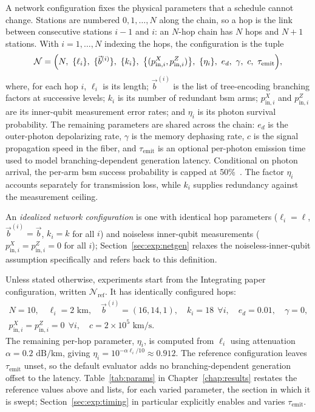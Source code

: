 A network configuration fixes the physical parameters that a schedule cannot change. Stations are numbered $0,1,\dots,N$ along the chain, so a hop is the link between consecutive stations $i-1$ and $i$: an $N$-hop chain has $N$ hops and $N+1$ stations. With $i=1,\dots,N$ indexing the hops, the configuration is the tuple
\[
    \mathcal{N} = \Bigl(N,\ \{\ell_i\},\ \{\vec{b}^{(i)}\},\ \{k_i\},\ \bigl\{(p_{\mathrm{in},i}^{X}, p_{\mathrm{in},i}^{Z})\bigr\},\ \{\eta_i\},\ e_d,\ \gamma,\ c,\ \tau_{\mathrm{emit}}\Bigr),
\]
where, for each hop $i$, $\ell_i$ is its length; $\vec{b}^{(i)}$ is the list of tree-encoding branching factors at successive levels; $k_i$ is its number of redundant \Gls{bsm} arms; $p_{\mathrm{in},i}^{X}$ and $p_{\mathrm{in},i}^{Z}$ are its inner-qubit measurement error rates; and $\eta_i$ is its photon survival probability. The remaining parameters are shared across the chain: $e_d$ is the outer-photon depolarizing rate, $\gamma$ is the memory dephasing rate, $c$ is the signal propagation speed in the fiber, and $\tau_{\mathrm{emit}}$ is an optional per-photon emission time used to model branching-dependent generation latency. Conditional on photon arrival, the per-arm \Gls{bsm} success probability is capped at 50\%~\cite{Ewert20143,Benchasattabuse2026Bridging}. The factor $\eta_i$ accounts separately for transmission loss, while $k_i$ supplies redundancy against the measurement ceiling.

An \emph{idealized network configuration} is one with identical hop parameters ($\ell_i=\ell$, $\vec b^{(i)}=\vec b$, $k_i=k$ for all $i$) and noiseless inner-qubit measurements ($p_{\mathrm{in},i}^{X}=p_{\mathrm{in},i}^{Z}=0$ for all $i$); Section~\ref{sec:exp:netgen} relaxes the noiseless-inner-qubit assumption specifically and refers back to this definition.

\clearpage %

Unless stated otherwise, experiments start from the Integrating paper configuration, written $\mathcal{N}_{\mathrm{ref}}$. It has identically configured hops:
\[
\begin{gathered}
    N = 10,\quad \ell_i = 2\text{ km},\quad \vec{b}^{(i)} = (16,14,1),\quad k_i = 18\ \ \forall i,\quad e_d = 0.01,\quad \gamma = 0,\\
    p_{\mathrm{in},i}^{X} = p_{\mathrm{in},i}^{Z} = 0\ \ \forall i,\quad c = 2\times 10^{5}\text{ km/s}.
\end{gathered}
\]
The remaining per-hop parameter, $\eta_i$, is computed from $\ell_i$ using attenuation $\alpha=0.2\text{ dB/km}$, giving $\eta_i=10^{-\alpha\ell_i/10}\approx0.912$. The reference configuration leaves $\tau_{\mathrm{emit}}$ unset, so the default evaluator adds no branching-dependent generation offset to the latency. Table~\ref{tab:params} in Chapter~\ref{chap:results} restates the reference values above and lists, for each varied parameter, the section in which it is swept; Section~\ref{sec:exp:timing} in particular explicitly enables and varies $\tau_{\mathrm{emit}}$.

